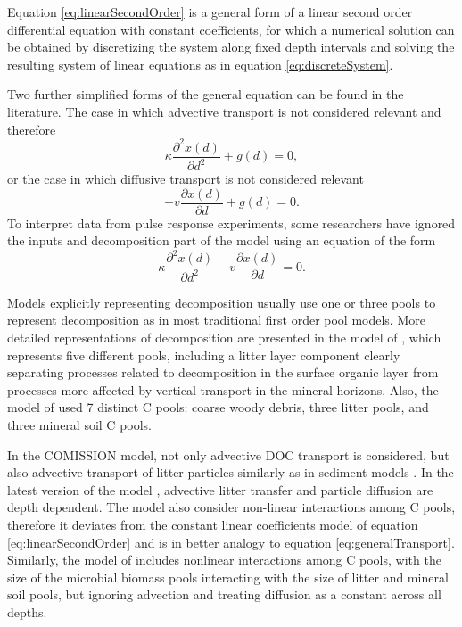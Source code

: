 \documentclass[11pt, oneside, a4paper]{article}   	%
\begin{document}
Equation \ref{eq:linearSecondOrder} is a general form of a linear second order differential equation with constant coefficients, for which a numerical solution can be obtained by discretizing the system along fixed depth intervals and solving the resulting system of linear equations as in equation \ref{eq:discreteSystem}.

Two further simplified forms of the general equation can be found in the literature. The case in which advective transport is not considered relevant \citep[e.g.][]{OBrien1978} and therefore
\begin{equation} \label{eq:linearDiffusion}
 \kappa \frac{\partial^2 x(d)}{\partial d^2}  + g(d) =0,
\end{equation}
or the case in which diffusive transport is not considered relevant \citep[e.g.][]{Feng1999, Baisden2002, Baisden2007}
\begin{equation} \label{eq:linearAdvection}
- v \frac{\partial x(d)}{\partial d} + g(d) =0.
\end{equation}
To interpret data from pulse response experiments, some researchers have ignored the inputs and decomposition part of the model \citep[e.g.][]{Bruun2007} using an equation of the form
\begin{equation} \label{eq:noDecomposition}
 \kappa \frac{\partial^2 x(d)}{\partial d^2} - v \frac{\partial x(d)}{\partial d} =0.
\end{equation}

Models explicitly representing decomposition usually use one or three pools to represent decomposition as in most traditional first order pool models. More detailed representations of decomposition are presented in the model of \citet{Braakhekke2011, Braakhekke2013}, which represents five different pools, including a litter layer component clearly separating processes related to decomposition in the surface organic layer from processes more affected by vertical transport in the mineral horizons. Also, the model of \citet{Koven2013BGS} used 7 distinct C pools: coarse woody debris, three litter pools, and three mineral soil C pools. 

In the COMISSION model, not only advective DOC transport is considered, but also advective transport of litter particles similarly as in sediment models \citep{Ahrens2015, Ahrens2020}. In the latest version of the model \citep{Ahrens2020}, advective litter transfer and particle diffusion are depth dependent. The model also consider non-linear interactions among C pools, therefore it deviates from the constant linear coefficients model of equation \ref{eq:linearSecondOrder} and is in better analogy to equation \ref{eq:generalTransport}. Similarly, the model of \citet{Wang2021} includes nonlinear interactions among C pools, with the size of the microbial biomass pools interacting with the size of litter and mineral soil pools, but ignoring advection and treating diffusion as a constant across all depths.  
\end{document}
